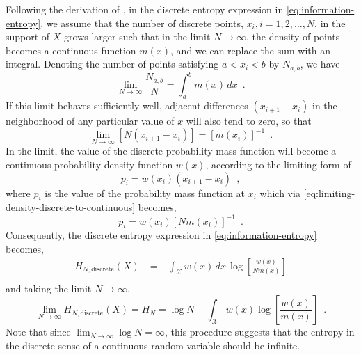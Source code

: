 \iffalse


Following the derivation of \textcite{jaynes_information_1957}, in the discrete entropy expression in \cref{eq:information-entropy}, we assume that the number of discrete points, $x_i, i=1,2,\dots,N$, in the support of $X$ grows larger such that in the limit $N\rightarrow\infty$, the density of points becomes a continuous function $m(x)$, and we can replace the sum with an integral. Denoting the number of points satisfying $a<x_i<b$ by $N_{a,b}$, we have
%
\begin{equation}
    \lim_{N\rightarrow\infty} \frac{N_{a,b}}{N} = \int_a^b m(x) \, dx \enspace .
\end{equation}
%
If this limit behaves sufficiently well, adjacent differences $(x_{i+1} - x_{i})$ in the neighborhood of any particular value of $x$ will also tend to zero, so that
%
\begin{equation} \label{eq:limiting-density-discrete-to-continuous}
    \lim_{N\rightarrow\infty} \left[ N(x_{i+1} - x_{i}) \right] = \left[ m(x_{i}) \right]^{-1} \enspace .
\end{equation}
%
In the limit, the value of the discrete probability mass function will become a continuous probability density function $w(x)$, according to the limiting form of
%
\begin{equation}
    p_i = w(x_i)\left(x_{i+1} - x_{i}\right) \enspace ,
\end{equation}
%
where $p_i$ is the value of the probability mass function at $x_i$ which via \cref{eq:limiting-density-discrete-to-continuous} becomes,
%
\begin{equation}
    p_i = w(x_i)\left[Nm(x_i)\right]^{-1} \enspace .
\end{equation}
%
Consequently, the discrete entropy expression in \cref{eq:information-entropy} becomes,
\begin{align}
    H_{N,\text{discrete}}(X) &= - \int_\mathcal{X} w(x) \, dx \, \log \left[\frac{w(x)}{Nm(x)}\right] \nonumber \\
\end{align}
%
and taking the limit $N\rightarrow\infty$,
%
\begin{equation}
    \lim_{N\rightarrow\infty} H_{N,\text{discrete}}(X) = H_{N} = \log N - \int_\mathcal{X} w(x) \log \left[\frac{w(x)}{m(x)}\right] \enspace .
\end{equation}
%
Note that since $\lim_{N\rightarrow\infty} \log N = \infty$, this procedure suggests that the entropy in the discrete sense of a continuous random variable should be infinite.




